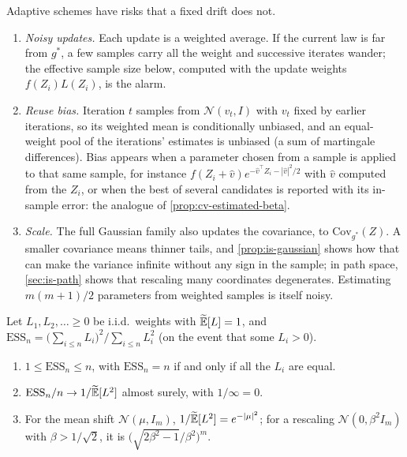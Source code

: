 Adaptive schemes have risks that a fixed drift does not.
\begin{enumerate}[label=(\alph*)]
  \item \emph{Noisy updates.} Each update is a weighted average. If the current law is far from
    $g^*$, a few samples carry all the weight and successive iterates wander; the effective
    sample size below, computed with the update weights $f(Z_i)L(Z_i)$, is the alarm.
  \item \emph{Reuse bias.} Iteration $t$ samples from $\mathcal N(v_t,I)$ with $v_t$ fixed by
    earlier iterations, so its weighted mean is conditionally unbiased, and an equal-weight pool
    of the iterations' estimates is unbiased (a sum of martingale differences). Bias appears
    when a parameter chosen from a sample is applied to that same sample, for instance
    $f(Z_i+\hat v)e^{-\hat v^\top Z_i-|\hat v|^2/2}$ with $\hat v$ computed from the $Z_i$, or
    when the best of several candidates is reported with its in-sample error: the analogue of
    \cref{prop:cv-estimated-beta}.
  \item \emph{Scale.} The full Gaussian family also updates the covariance, to
    $\mathrm{Cov}_{g^*}(Z)$. A smaller covariance means thinner tails, and
    \cref{prop:is-gaussian} shows how that can make the variance infinite without any sign in
    the sample; in path space, \cref{sec:is-path} shows that rescaling many coordinates
    degenerates. Estimating $m(m+1)/2$ parameters from weighted samples is itself noisy.
\end{enumerate}

\begin{proposition}\label{prop:is-ess}
Let $L_1,L_2,\dots\ge0$ be i.i.d.\ weights with $\widetilde{\mathbb E}[L]=1$, and
$\mathrm{ESS}_n=\big(\sum_{i\le n}L_i\big)^2/\sum_{i\le n}L_i^2$ (on the event that some
$L_i>0$).
\begin{enumerate}[label=(\roman*)]
  \item $1\le\mathrm{ESS}_n\le n$, with $\mathrm{ESS}_n=n$ if and only if all the $L_i$ are equal.
  \item $\mathrm{ESS}_n/n\to1/\widetilde{\mathbb E}[L^2]$ almost surely, with $1/\infty=0$.
  \item For the mean shift $\mathcal N(\mu,I_m)$, $1/\widetilde{\mathbb E}[L^2]=e^{-|\mu|^2}$; for a rescaling
    $\mathcal N(0,\beta^2I_m)$ with $\beta>1/\sqrt2$, it is $\big(\sqrt{2\beta^2-1}/\beta^2\big)^m$.
\end{enumerate}
\end{proposition}

